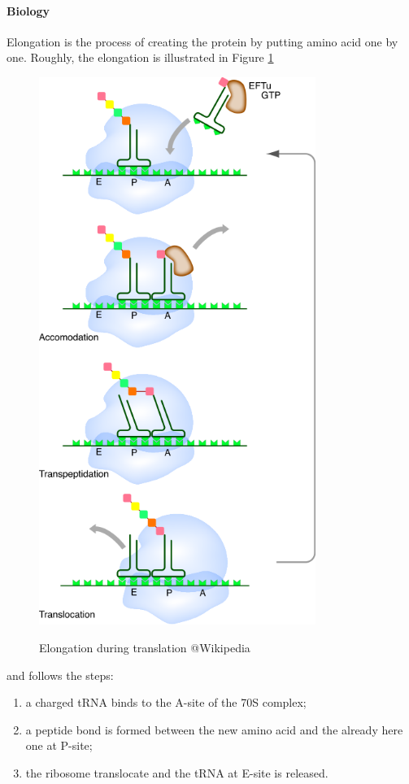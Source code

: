 \paragraph{Biology} Elongation is the process of creating the protein by putting amino acid one by one. Roughly, the elongation is illustrated in Figure \ref{fig:elongationTranslate}
\begin{figure}[hbtp]
  \centering
  \includegraphics[width=9cm]{figure/proteinTranslationFromWikipediaModif.png}\\
  \caption{Elongation during translation @Wikipedia}\label{fig:elongationTranslate}
\end{figure}
and follows the steps:
\begin{enumerate}
  \item a charged tRNA binds to the A-site of the 70S complex;
  \item a peptide bond is formed between the new amino acid and the already here one at P-site;
  \item the ribosome translocate and the tRNA at E-site is released.
\end{enumerate}
